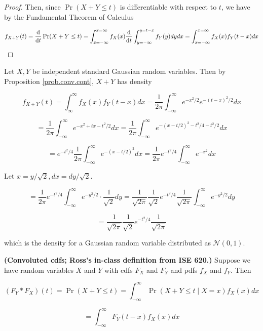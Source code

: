 \begin{theorem}
\begin{proposition}
\begin{proof}
Then, since \(\Pr(X+Y \leq t)\) is differentiable with respect to \(t\), we have by the Fundamental Theorem of Calculus

\[
f_{X+Y}(t) = \deriv{}{t} \Pr(X+Y \leq t) = \int_{x=-\infty}^{x=\infty} f_{X}(x) \deriv{}{t} \int_{y=-\infty}^{y=t-x}  f_Y(y)dy dx = \int_{x=-\infty}^{x=\infty} f_X(x) f_Y(t-x) dx
\]
\end{proof}

\end{proposition}

\begin{example}\label{prob.sums.standard.gaussians} Let \(X, Y\) be independent standard Gaussian random variables. Then by Proposition \ref{prob.conv.cont}, \(X+Y\) has density 

\[
f_{X+Y}(t) = \int_{\infty}^\infty f_X(x) f_Y(t-x) dx = \frac{1}{2\pi} \int_{-\infty}^\infty e^{-x^2/2} e^{-(t-x)^2/2} dx 
\]

\[
= \frac{1}{2\pi} \int_{-\infty}^\infty e^{-x^2+tx -t^2/2} dx = \frac{1}{2\pi} \int_{-\infty}^\infty e^{-(x-t/2)^2 - t^2/4-t^2/2} dx 
\]

\[
= e^{-t^2/4} \frac{1}{2\pi} \int_{-\infty}^\infty e^{-(x-t/2)^2}dx = \frac{1}{2\pi} e^{-t^2/4}\int_{-\infty}^\infty e^{-x^2}dx
\]

Let \(x = y/\sqrt{2}, dx=dy/\sqrt{2}\).

\[
=\frac{1}{2\pi} e^{-t^2/4} \int_{-\infty}^\infty e^{-y^2/2} \cdot \frac{1}{\sqrt{2}} dy = \frac{1}{\sqrt{2\pi}} \frac{1}{\sqrt{2}} e^{-t^2/4} \frac{1}{\sqrt{2 \pi}} \int_{-\infty}^\infty e^{-y^2/2} dy 
\]

\[
=  \frac{1}{\sqrt{2\pi}} \frac{1}{\sqrt{2}} e^{-t^2/4} \frac{1}{\sqrt{2 \pi}}
 \]
 
 which is the density for a Gaussian random variable distributed as \(\mathcal{N}(0,1)\).

\end{example}

\begin{definition} \textbf{(Convoluted cdfs; Ross's in-class definition from ISE 620.)} Suppose we have random variables \(X\) and \(Y\) with cdfs \(F_X\) and \(F_Y\) and pdfs \(f_X\) and \(f_Y\). Then

\[
(F_Y * F_X)(t) = \Pr(X+ Y \leq t) = \int_{-\infty}^\infty \Pr(X+Y \leq t \mid X=x) f_X(x) dx 
\]

\[
= \int_{-\infty}^\infty F_Y(t-x) f_X(x) dx 
\]

\end{definition}


\end{theorem}
